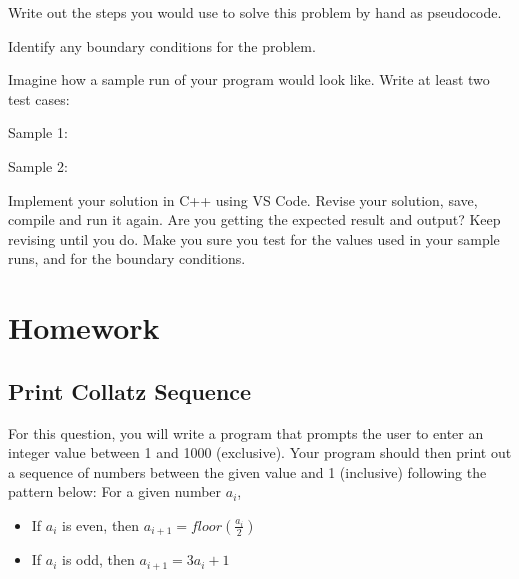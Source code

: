 \begin{multipart}
   Write out the steps you would use to solve this problem by hand as pseudocode.
\end{multipart}

\vspace{3cm}

\begin{multipart}
    Identify any boundary conditions for the problem.
\end{multipart}

\vspace{2cm}

\begin{multipart}
     Imagine how a sample run of your program would look like. Write at least two test cases:
\end{multipart}

Sample 1:

\vspace{1.5cm}

Sample 2:

\vspace{1.5cm}


\begin{multipart}
    Implement your solution in C++ using VS Code. Revise your solution, save, compile and run it again. Are you getting the expected result and output? Keep revising until you do. Make you sure you test for the values used in your sample runs, and for the boundary conditions.
\end{multipart}
\section{Homework}

\subsection{Print Collatz Sequence}

For this question, you will write a program that prompts the user to enter an integer value between 1 and 1000 (exclusive). Your program should then print out a sequence of numbers between the given value and 1 (inclusive) following the pattern below:
For a given number $a_i$,

\begin{itemize}
    \item If $a_i$ is even, then $a_{i+1} = floor(\frac{a_i}{2})$
    \item If $a_i$ is odd, then $a_{i+1} = 3a_i + 1$
\end{itemize}

